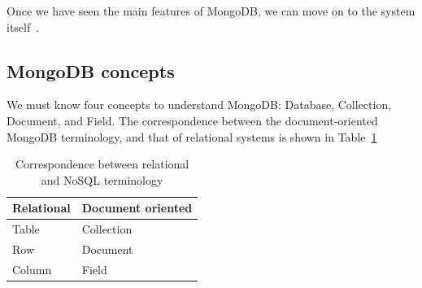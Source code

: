 Once we have seen the main features of MongoDB, we can move on to the 
system %
itself~\cite{MongoWeb,Chodorow10,Chodorow11}.



\subsection{MongoDB concepts} %
\label{sub:mongodb_concepts}

We must know four concepts to understand MongoDB: Database, Collection, Document, and Field. The correspondence between the document-oriented MongoDB terminology, and that of relational systems is shown in
Table~\ref{tab:relationalvsdocument}




\begin{table}
\begin{center}
\begin{tabular}{ll} %
\textbf{Relational} & \textbf{Document oriented} \\ \midrule[2pt]
Table & Collection\\ \midrule %
Row & Document\\ \midrule %
Column & Field \\
\end{tabular}
\end{center}
\caption{Correspondence between relational and NoSQL terminology}
\label{tab:relationalvsdocument}
\end{table}



